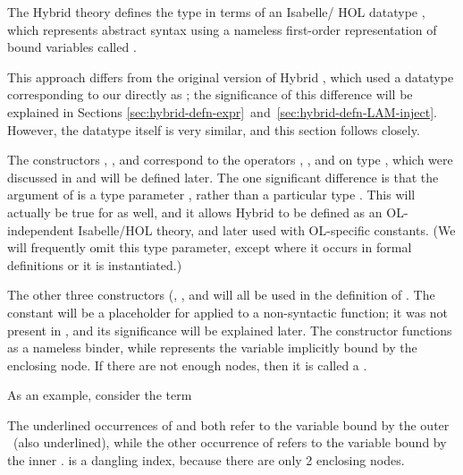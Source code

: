 \documentclass[copyright,creativecommons]{eptcs}
\begin{document}
The Hybrid theory defines the type  in terms of an Isabelle\slash
HOL datatype , which represents abstract syntax using a nameless
first-order representation of bound variables called  \cite{debruijn:1972}.

This approach differs from the original version of Hybrid
\cite{ambler/crole/momigliano:2002}, which used a datatype corresponding
to our  directly as ; the significance of this difference
will be explained in Sections \ref{sec:hybrid-defn-expr}~and~\ref{sec:hybrid-defn-LAM-inject}.  However, the datatype itself is very
similar, and this section follows \cite{ambler/crole/momigliano:2002} closely.

\begin{Defn}
\label{defn:hybrid-dB-type} \formal
\par\nopagebreak
\par\nopagebreak \par\nopagebreak[3]
\par\nopagebreak
\par\nopagebreak

\end{Defn}

The constructors , , and  correspond to the
operators , , and  on type , which
were discussed in  and will be defined later.
The one significant difference is that the argument of  is a
type parameter , rather than a particular type .  This
will actually be true for  as well, and it allows Hybrid to be
defined as an OL-independent Isabelle\slash HOL theory, and later used
with OL-specific constants.  (We will frequently omit this type parameter,
except where it occurs in formal definitions or it is instantiated.)

The other three constructors (, , and  will
all be used in the definition of .  The constant  will
be a placeholder for  applied to a non-syntactic function; it was
not present in \cite{ambler/crole/momigliano:2002}, and its significance
will be explained later.  The constructor  functions as a
nameless binder, while  represents the variable implicitly
bound by the  enclosing  node.
If there are not enough  nodes, then it is called a
.

As an example, consider the term
  
The underlined occurrences of  and  both
refer to the variable bound by the outer \ (also underlined), while
the other occurrence of  refers to the variable bound by
the inner .   is a dangling index, because there
are only 2 enclosing  nodes.
\end{document}

